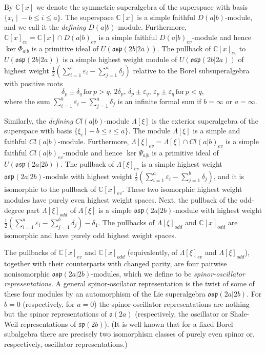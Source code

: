 \documentclass[12pt]{amsart}
\theoremstyle{plain} %
\numberwithin{equation}{section}
\theoremstyle{definition}
\theoremstyle{remark}
\theoremstyle{plain} %
\renewcommand{\sp}{\mathfrak{sp}}
\newcommand{\so}{\mathfrak{o}}
\newcommand{\osp}{\mathfrak{osp}}
\newcommand{\C}{\mathbb{C}}
\begin{document}
By $\C [x]$ we denote the symmetric superalgebra of the superspace with basis\\ $\{ x_i \; | \;  -b \leq i \leq a \} $.  The superspace  $\C [x]$   is  a simple faithful $D(a|b)$-module, and we call it the  \emph{defining} $D(a|b)$-module.  Furthermore, $\mathbb C[x]_{ev} = \mathbb C[x] \cap D(a|b)_{ev}$ is a simple faithful $D(a|b)_{ev}$-module and hence $\ker \Phi_{a|b}$ is a primitive ideal of $U(\osp(2b|2a))$. The pullback of $\mathbb{C}[x]_{ev}$ to
    $U(\osp(2b | 2a))$ is a simple highest weight module of $U(\osp(2b | 2a))$ of highest weight $\frac{1}{2}\left( \sum_{i=1}^b \varepsilon_i - \sum_{j=1}^a \delta_j \right)$ relative to the Borel subsuperalgebra with positive roots 
    $$\delta_p\pm\delta_q\,\text{for}\,p>q,\,2\delta_{p},\,\delta_p\pm\varepsilon_q,\,\varepsilon_p\pm\varepsilon_q\,\text{for}\,p<q,$$
where the sum $\sum_{i=1}^b \varepsilon_i-\sum_{j=1}^a \delta_j$ is an infinite formal sum if $b=\infty$ or $a=\infty$. 
  

    
    Similarly, the \emph{defining} $Cl(a|b)$-module $\Lambda[\xi]$ is the exterior superalgebra of the superspace with basis $\{ \xi_i \, | \, -b\leq i \leq a \}$. The module $\Lambda[\xi]$ is a  simple and faithful  $Cl(a|b)$-module. Furthermore, $\Lambda[\xi]_{ev} = \Lambda[\xi] \cap Cl(a|b)_{ev}$ is a simple faithful $Cl(a|b)_{ev}$-module and hence 
     $\ker \Psi_{a|b}$ is a primitive ideal of $U(\osp(2a|2b))$. The pullback of $\Lambda [\xi]_{ev}$ is a simple highest weight $\osp(2a|2b)$-module with highest weight $\frac{1}{2}\left( \sum_{i=1}^a \varepsilon_i - \sum_{j=1}^b \delta_j \right)$, and it is isomorphic  to the pullback of $\mathbb{C}[x]_{ev}$.    These two  isomorphic highest weight modules have purely even highest weight spaces. Next, the pullback of the odd-degree part $\Lambda [\xi]_{odd}$ of  $\Lambda [\xi]$ is a simple $\osp(2a|2b)$-module  with highest weight $\frac{1}{2}\left( \sum_{i=1}^a \varepsilon_i - \sum_{j=1}^b \delta_j \right) - \delta_1$. The pullbacks of $\Lambda [\xi]_{odd}$ and $\mathbb{C}[x]_{odd}$ are isomorphic and have purely odd  highest weight  spaces.

     
      The  pullbacks of  $\mathbb{C}[x]_{ev}$ and $\mathbb{C}[x]_{odd}$ (equivalently,  of 
     $\Lambda [\xi]_{ev}$ and  $\Lambda [\xi]_{odd}$),
         together with their counterparts with changed parity, are four pairwise nonisomorphic $\osp(2a|2b)$-modules, which we define to be \emph{spinor-oscillator representations}. A general spinor-oscilator representation is the twist of some of these four modules by an automorphism of the Lie superalgebra $\osp(2a|2b)$. For $b=0$ (respectively, for $a=0$) the spinor-oscillator representations are nothing but the spinor representations of $\so(2a)$ (respectively, the oscillator or Shale-Weil representations of $\sp(2b)$). (It is well known that for a fixed Borel subalgebra there are precisely two isomorphism classes of purely even spinor or, respectively, oscillator representations.)
         
\end{document}
